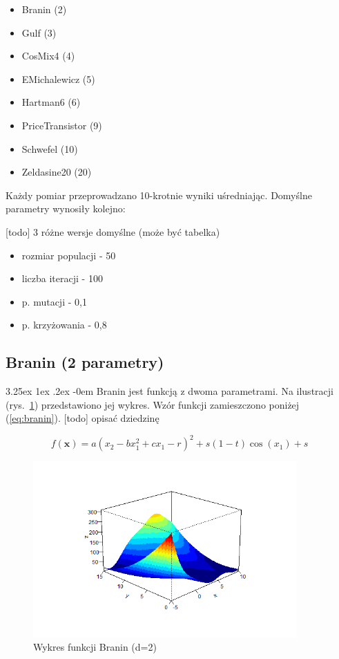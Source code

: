 \documentclass[11pt, a4paper]{article}
\makeatletter
\newcommand{\fbi}{\leavevmode{\parindent=1em\indent}}
\renewcommand\paragraph{\@startsection{paragraph}{5}{\z@}%
  {3.25ex \@plus1ex \@minus.2ex}%
  {-0em}%
  {\normalfont\normalsize\bfseries}}
\makeatother
\begin{document}
\begin{itemize}
	\item Branin (2)
	\item Gulf (3)
	\item CosMix4 (4)
	\item EMichalewicz (5)
	\item Hartman6 (6)
	\item PriceTransistor (9)
	\item Schwefel (10)
	\item Zeldasine20 (20)
\end{itemize}

\fbi
Każdy pomiar przeprowadzano 10-krotnie wyniki uśredniając. Domyślne parametry wynosiły kolejno:

[todo] 3 różne wersje domyślne (może być tabelka)
\begin{itemize}
	\item rozmiar populacji - 50
	\item liczba iteracji - 100
	\item p. mutacji - 0,1
	\item p. krzyżowania - 0,8
\end{itemize}

\subsection{Branin (2 parametry)}
\paragraph{}
Branin jest funkcją z dwoma parametrami. Na ilustracji (rys.~\ref{fig:branin1}) przedstawiono jej wykres. Wzór funkcji zamieszczono poniżej (\ref{eq:branin}).
[todo] opisać dziedzinę


\begin{equation}\label{eq:branin}
	f(\boldsymbol{x}) = a(x_2 - bx_1^2 + cx_1 - r)^2 + s(1 - t)\cos(x_1) + s
\end{equation}


\begin{figure}[H]
	\centering
	\includegraphics[width=0.9\textwidth]{./assets/Branin1.png}
	\caption{Wykres funkcji Branin (d=2)}
	\label{fig:branin1}
\end{figure}
\end{document}
